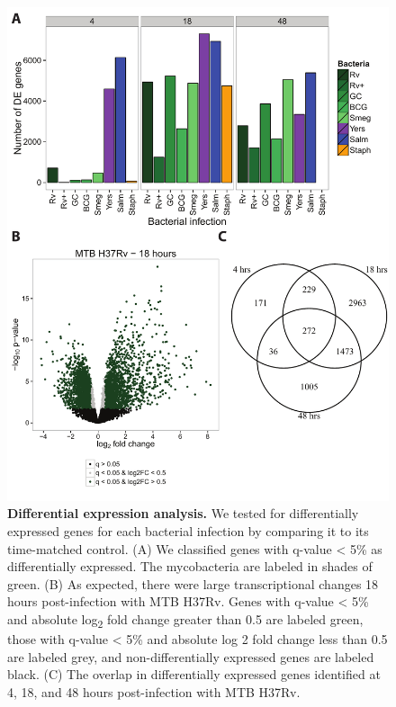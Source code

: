 \begin{figure}
\centering
\includegraphics[width=5in]{img/ch02/fig-01-differential-expression.pdf}
\caption[Differential expression analysis.]{\textbf{Differential
    expression analysis.} We tested for differentially expressed genes
  for each bacterial infection by comparing it to its time-matched
  control. (A) We classified genes with q-value \textless{} 5\% as
  differentially expressed. The mycobacteria are labeled in shades of
  green. (B) As expected, there were large transcriptional changes 18
  hours post-infection with MTB H37Rv. Genes with q-value \textless{}
  5\% and absolute log\textsubscript{2} fold change greater than 0.5
  are labeled green, those with q-value \textless{} 5\% and absolute
  log 2 fold change less than 0.5 are labeled grey, and
  non-differentially expressed genes are labeled black. (C) The
  overlap in differentially expressed genes identified at 4, 18, and
  48 hours post-infection with MTB H37Rv.  }
\label{fig:differential-expression}
\end{figure}


